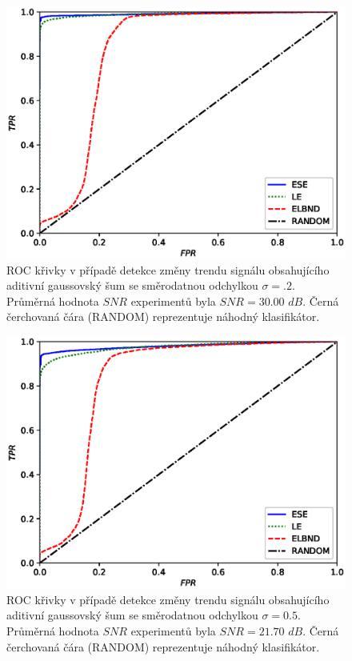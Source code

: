 \begin{figure}[ht!]
    \centering
    \includegraphics[scale=0.7]{IMG/appel_roc/roc_02.eps}
    \caption{ROC křivky v případě detekce změny trendu signálu obsahujícího aditivní gaussovský šum se směrodatnou odchylkou $\sigma=.2$. Průměrná hodnota $SNR$ experimentů byla $SNR=30.00$ $dB$. Černá čerchovaná čára (RANDOM) reprezentuje náhodný klasifikátor.}
    \label{fig:roc_02}
\end{figure}
\begin{figure}[ht!]
    \centering
    \includegraphics[scale=0.73]{IMG/appel_roc/roc_05.eps}
    \caption{ROC křivky v případě detekce změny trendu signálu obsahujícího aditivní gaussovský šum se směrodatnou odchylkou $\sigma=0.5$. Průměrná hodnota $SNR$ experimentů byla $SNR=21.70$ $dB$. Černá čerchovaná čára (RANDOM) reprezentuje náhodný klasifikátor.}
    \label{fig:roc_05}
\end{figure}
